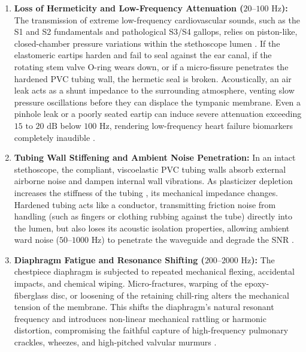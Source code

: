 \begin{enumerate}
    \item \textbf{Loss of Hermeticity and Low-Frequency Attenuation ($20\text{--}100\text{ Hz}$):} The transmission of extreme low-frequency cardiovascular sounds, such as the S1 and S2 fundamentals and pathological S3/S4 gallops, relies on piston-like, closed-chamber pressure variations within the stethoscope lumen \cite{ertel1966stethoscope}. If the elastomeric eartips harden and fail to seal against the ear canal, if the rotating stem valve O-ring wears down, or if a micro-fissure penetrates the hardened PVC tubing wall, the hermetic seal is broken. Acoustically, an air leak acts as a shunt impedance to the surrounding atmosphere, venting slow pressure oscillations before they can displace the tympanic membrane. Even a pinhole leak or a poorly seated eartip can induce severe attenuation exceeding $15\text{ to }20\text{ dB}$ below $100\text{ Hz}$, rendering low-frequency heart failure biomarkers completely inaudible \cite{ertel1966stethoscope, leng2015electronic}.
    
    \item \textbf{Tubing Wall Stiffening and Ambient Noise Penetration:} In an intact stethoscope, the compliant, viscoelastic PVC tubing walls absorb external airborne noise and dampen internal wall vibrations. As plasticizer depletion increases the stiffness of the tubing \cite{josh2012temperature}, its mechanical impedance changes. Hardened tubing acts like a conductor, transmitting friction noise from handling (such as fingers or clothing rubbing against the tube) directly into the lumen, but also loses its acoustic isolation properties, allowing ambient ward noise ($50\text{--}1000\text{ Hz}$) to penetrate the waveguide and degrade the SNR \cite{leng2015electronic}.
    
    \item \textbf{Diaphragm Fatigue and Resonance Shifting ($200\text{--}2000\text{ Hz}$):} The chestpiece diaphragm is subjected to repeated mechanical flexing, accidental impacts, and chemical wiping. Micro-fractures, warping of the epoxy-fiberglass disc, or loosening of the retaining chill-ring alters the mechanical tension of the membrane. This shifts the diaphragm's natural resonant frequency and introduces non-linear mechanical rattling or harmonic distortion, compromising the faithful capture of high-frequency pulmonary crackles, wheezes, and high-pitched valvular murmurs \cite{leng2015electronic}.
\end{enumerate}

